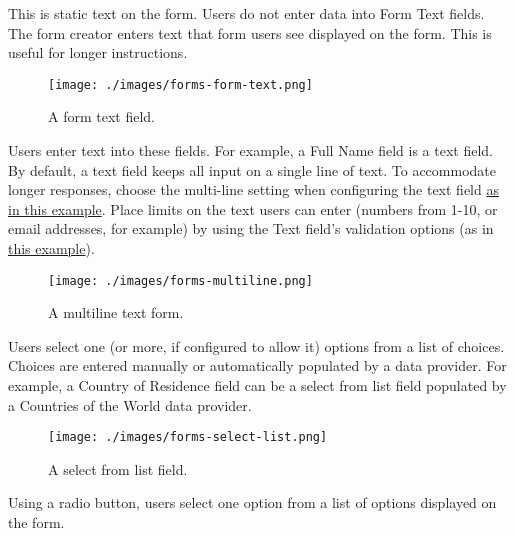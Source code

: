 \begin{description}
\tightlist
\item[Form Text]
This is static text on the form. Users do not enter data into Form Text
fields. The form creator enters text that form users see displayed on
the form. This is useful for longer instructions.
\end{description}

\begin{figure}
\centering
\texttt{[image: ./images/forms-form-text.png]}
\caption{A form text field.}
\end{figure}

\begin{description}
\tightlist
\item[Text Field]
Users enter text into these fields. For example, a Full Name field is a
text field. By default, a text field keeps all input on a single line of
text. To accommodate longer responses, choose the multi-line setting
when configuring the text field
\href{/docs/7-0/user/-/knowledge_base/u/basic-forms\#building-a-form}{as
in this example}. Place limits on the text users can enter (numbers from
1-10, or email addresses, for example) by using the Text field's
validation options (as in
\href{/docs/7-0/user/-/knowledge_base/u/creating-advanced-forms\#validating-text-fields}{this
example}).
\end{description}

\begin{figure}
\centering
\texttt{[image: ./images/forms-multiline.png]}
\caption{A multiline text form.}
\end{figure}

\begin{description}
\tightlist
\item[Select from List]
Users select one (or more, if configured to allow it) options from a
list of choices. Choices are entered manually or automatically populated
by a data provider. For example, a Country of Residence field can be a
select from list field populated by a Countries of the World data
provider.
\end{description}

\begin{figure}
\centering
\texttt{[image: ./images/forms-select-list.png]}
\caption{A select from list field.}
\end{figure}

\begin{description}
\tightlist
\item[Single Selection]
Using a radio button, users select one option from a list of options
displayed on the form.
\end{description}

